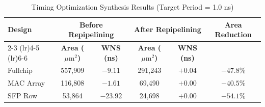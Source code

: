 \documentclass[journal]{IEEEtran}
\begin{document}
\begin{table}[t]
    \centering
    \caption{Timing Optimization Synthesis Results (Target Period = 1.0 ns)\label{tab:s5_timing}}
    \begin{tabular}{l c c c c c}
        \toprule
        \textbf{Design} & \multicolumn{2}{c}{\textbf{Before Repipelining}} & \multicolumn{2}{c}{\textbf{After Repipelining}} & \textbf{Area Reduction} \\
        \cmidrule(lr){2-3} \cmidrule(lr){4-5} \cmidrule(lr){6-6}
        & \textbf{Area ($\mu\text{m}^2$)} & \textbf{WNS (ns)} & \textbf{Area ($\mu\text{m}^2$)} & \textbf{WNS (ns)} & \\
        \midrule
        Fullchip  & 557{,}909 & $-9.11$  & 291{,}243 & $+0.04$ & $-47.8$\% \\
        MAC Array & 116{,}808 & $-1.61$ & 69{,}490  & $+0.00$ & $-40.5$\% \\
        SFP Row   & 53{,}864  & $-23.92$ & 24{,}698  & $+0.00$ & $-54.1$\% \\
        \bottomrule
    \end{tabular}
\end{table}
\end{document}
